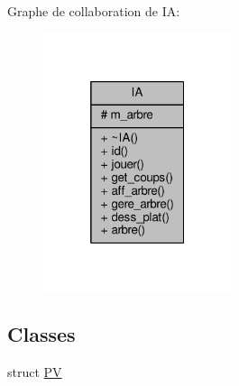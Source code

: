 Graphe de collaboration de IA\+:\nopagebreak
\begin{figure}[H]
\begin{center}
\leavevmode
\includegraphics[width=157pt]{classIA__coll__graph}
\end{center}
\end{figure}
\subsection*{Classes}
\begin{DoxyCompactItemize}
\item 
struct \hyperlink{structIA_1_1PV}{PV}
\end{DoxyCompactItemize}
